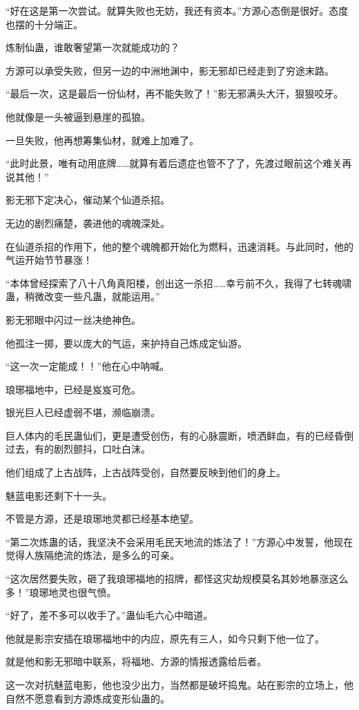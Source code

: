 \begin{this_body}
“好在这是第一次尝试。就算失败也无妨，我还有资本。”方源心态倒是很好。态度也摆的十分端正。

炼制仙蛊，谁敢奢望第一次就能成功的？

方源可以承受失败，但另一边的中洲地渊中，影无邪却已经走到了穷途末路。

“最后一次，这是最后一份仙材，再不能失败了！”影无邪满头大汗，狠狠咬牙。

他就像是一头被逼到悬崖的孤狼。

一旦失败，他再想筹集仙材，就难上加难了。

“此时此景，唯有动用底牌……就算有着后遗症也管不了了，先渡过眼前这个难关再说其他！”

影无邪下定决心，催动某个仙道杀招。

无边的剧烈痛楚，袭进他的魂魄深处。

在仙道杀招的作用下，他的整个魂魄都开始化为燃料，迅速消耗。与此同时，他的气运开始节节暴涨！

“本体曾经探索了八十八角真阳楼，创出这一杀招……幸亏前不久，我得了七转魂啸蛊，稍微改变一些凡蛊，就能运用。”

影无邪眼中闪过一丝决绝神色。

他孤注一掷，要以庞大的气运，来护持自己炼成定仙游。

“这一次一定能成！！”他在心中呐喊。

琅琊福地中，已经是岌岌可危。

银光巨人已经虚弱不堪，濒临崩溃。

巨人体内的毛民蛊仙们，更是遭受创伤，有的心脉震断，喷洒鲜血，有的已经昏倒过去，有的剧烈颤抖，口吐白沫。

他们组成了上古战阵，上古战阵受创，自然要反映到他们的身上。

魅蓝电影还剩下十一头。

不管是方源，还是琅琊地灵都已经基本绝望。

“第二次炼蛊的话，我坚决不会采用毛民天地流的炼法了！”方源心中发誓，他现在觉得人族隔绝流的炼法，是多么的可亲。

“这次居然要失败，砸了我琅琊福地的招牌，都怪这灾劫规模莫名其妙地暴涨这么多！”琅琊地灵也很气愤。

“好了，差不多可以收手了。”蛊仙毛六心中暗道。

他就是影宗安插在琅琊福地中的内应，原先有三人，如今只剩下他一位了。

就是他和影无邪暗中联系，将福地、方源的情报透露给后者。

这一次对抗魅蓝电影，他也没少出力，当然都是破坏捣鬼。站在影宗的立场上，他自然不愿意看到方源炼成变形仙蛊的。


\end{this_body}
